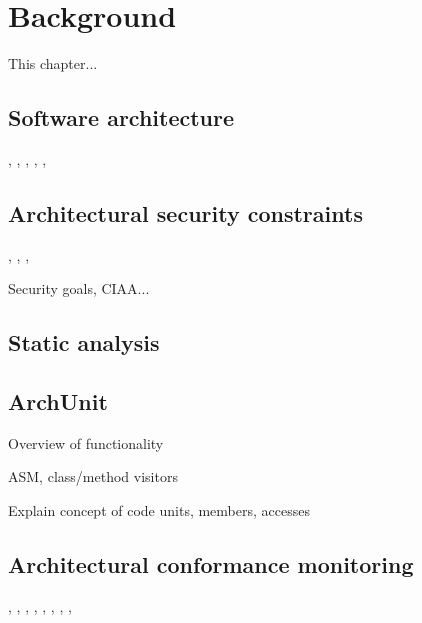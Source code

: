 \chapter{Background}

This chapter...

\section{Software architecture}
\cite{ambriola_introduction_1993}, \cite{jansen_software_2005}, \cite{bass_software_2013}, \cite{scandariato_architecting_2009}, \cite{nguyen_sospa_2015}, 

\section{Architectural security constraints}
\cite{broy_software_2007}, \cite{felderer_security_2016}, \cite{haley_security_2008}, 

Security goals, CIAA...

\section{Static analysis}

\section{ArchUnit}\label{archunit-back-section}

Overview of functionality

ASM, class/method visitors

Explain concept of code units, members, accesses

\section{Architectural conformance monitoring}
\cite{aldrich_archjava_2002}, \cite{abi-antoun_analyzing_2010}, \cite{luckham_event-based_1995}, \cite{abi-antoun_static_2009}, \cite{de_silva_controlling_2012}, \cite{knodel_comparison_2007}, \cite{jansen_documenting_2008}, \cite{hong_yan_discotect_2004}, 



